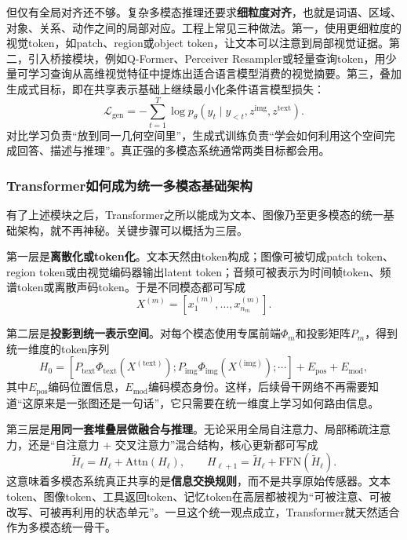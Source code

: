 \documentclass[12pt,a4paper]{article}
\begin{document}
但仅有全局对齐还不够。复杂多模态推理还要求\textbf{细粒度对齐}，也就是词语、区域、对象、关系、动作之间的局部对应。工程上常见三种做法。第一，使用更细粒度的视觉token，如patch、region或object token，让文本可以注意到局部视觉证据。第二，引入桥接模块，例如Q-Former、Perceiver Resampler或轻量查询token，用少量可学习查询从高维视觉特征中提炼出适合语言模型消费的视觉摘要。第三，叠加生成式目标，即在共享表示基础上继续最小化条件语言模型损失：
\begin{equation}
\mathcal{L}_{\text{gen}} = - \sum_{t=1}^{T}\log p_\theta(y_t \mid y_{<t}, z^{\text{img}}, z^{\text{text}}).
\end{equation}
对比学习负责“放到同一几何空间里”，生成式训练负责“学会如何利用这个空间完成回答、描述与推理”。真正强的多模态系统通常两类目标都会用。

\subsubsection{Transformer如何成为统一多模态基础架构}

有了上述模块之后，Transformer之所以能成为文本、图像乃至更多模态的统一基础架构，就不再神秘。关键步骤可以概括为三层。

第一层是\textbf{离散化或token化}。文本天然由token构成；图像可被切成patch token、region token或由视觉编码器输出latent token；音频可被表示为时间帧token、频谱token或离散声码token。于是不同模态都可写成
\begin{equation}
X^{(m)} = [x^{(m)}_1, \ldots, x^{(m)}_{n_m}].
\end{equation}

第二层是\textbf{投影到统一表示空间}。对每个模态使用专属前端$\Phi_m$和投影矩阵$P_m$，得到统一维度的token序列
\begin{equation}
H_0 = [P_{\text{text}}\Phi_{\text{text}}(X^{(\text{text})});
P_{\text{img}}\Phi_{\text{img}}(X^{(\text{img})});
\cdots] + E_{\text{pos}} + E_{\text{mod}},
\end{equation}
其中$E_{\text{pos}}$编码位置信息，$E_{\text{mod}}$编码模态身份。这样，后续骨干网络不再需要知道“这原来是一张图还是一句话”，它只需要在统一维度上学习如何路由信息。

第三层是\textbf{用同一套堆叠层做融合与推理}。无论采用全局自注意力、局部稀疏注意力，还是“自注意力 + 交叉注意力”混合结构，核心更新都可写成
\begin{equation}
\tilde{H}_{\ell} = H_{\ell} + \text{Attn}(H_{\ell}),
\qquad
H_{\ell+1} = \tilde{H}_{\ell} + \text{FFN}(\tilde{H}_{\ell}).
\end{equation}
这意味着多模态系统真正共享的是\textbf{信息交换规则}，而不是共享原始传感器。文本token、图像token、工具返回token、记忆token在高层都被视为“可被注意、可被改写、可被再利用的状态单元”。一旦这个统一观点成立，Transformer就天然适合作为多模态统一骨干。
\end{document}
